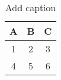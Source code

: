 \begin{table}[htbp]
  \centering
  \caption{Add caption}
    \begin{tabular}{|c|c|c|}
    \hline
    A     & B     & C \bigstrut\\
    \hline
    1     & 2     & 3 \bigstrut\\
    \hline
    4     & 5     & 6 \bigstrut\\
    \hline
    \end{tabular}%
  \label{tab:addlabel}%
\end{table}%
